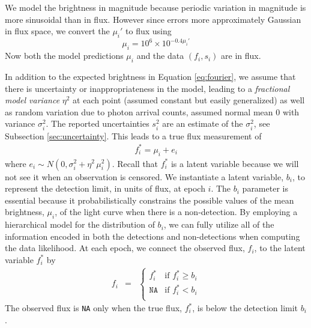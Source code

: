 \documentclass[12pt,preprint]{aastex}
\newcommand{\fobs}{f_i}
\newcommand{\ftrue}{f_i^*}
\begin{document}
We model the brightness in magnitude because periodic variation in magnitude is more sinusoidal than in flux. However since errors more approximately Gaussian in flux space, we convert the $\mu_i'$ to flux  using
\begin{equation*}
\mu_i = 10^6 \times 10^{-0.4 \mu_i'}
\end{equation*}
Now both the model predictions $\mu_i$ and the data $(f_i,s_i)$ are in flux.

In addition to the expected brightness in Equation \ref{eq:fourier}, we assume that there is uncertainty or inappropriateness in the model, leading to a \emph{fractional model variance} $\eta^2$ at each point (assumed constant but easily generalized) as well as random variation due to photon arrival counts, assumed normal mean 0 with variance $\sigma_i^2$. The reported uncertainties $s_i^2$ are an estimate of the $\sigma_i^2$, see Subsection \ref{sec:uncertainty}. This leads to a true flux measurement of
\begin{eqnarray}\displaystyle
\ftrue = \mu_i + e_i
\label{eq:truefluxdef}
\end{eqnarray}
where $e_i \sim N(0,\sigma_i^2 + \eta^2\,\mu_i^2)$. Recall that $f_i^*$ is a latent variable because we will not see it when an observation is censored. We instantiate a latent variable, $b_i$, to represent the detection limit, in units of flux, at epoch $i$.  The $b_i$ parameter is essential because it probabilistically constrains the possible values of the mean brightness, $\mu_i$, of the light curve when there is a non-detection.  By employing a hierarchical model for the distribution of $b_i$, we can fully utilize all of the information encoded in both the detections and non-detections when computing the data likelihood.   At each epoch, we connect the observed flux, $\fobs$, to the latent variable $\ftrue$ by
\begin{eqnarray}\displaystyle
\fobs &=& \left\{\begin{array}{ll}
  \ftrue & \mbox{if $\ftrue \ge b_i$} \\
  \texttt{NA} & \mbox{if $\ftrue < b_i$} \\
\end{array} \right.
\end{eqnarray}
The observed flux is \texttt{NA} only when the true flux, $\ftrue$, is below the detection limit $b_i$.
\end{document}
